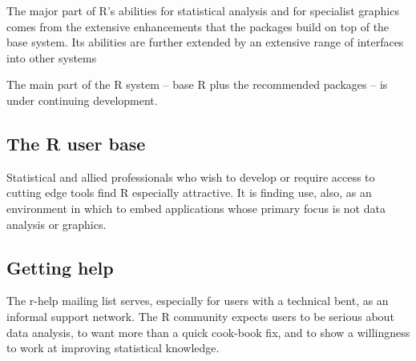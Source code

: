 The major part of R's abilities for statistical analysis
and for specialist graphics comes from the extensive enhancements that
the packages build on top of the base system.  Its abilities are
further extended by an extensive range of interfaces into
other systems

The main part of the R system -- base R plus the recommended packages
-- is under continuing development.
\subsection*{The R user base}

Statistical and allied professionals who wish to
develop or require access to cutting edge tools find R especially
attractive.  It is finding use, also, as an environment in which to
embed applications whose primary focus is not data analysis or
graphics.

\subsection*{Getting help}

\begin{fullwidth}
\end{fullwidth}

The r-help mailing list  serves, especially
for users with a technical bent, as an informal support network.  The
R community expects users to be serious about data analysis, to want
more than a quick cook-book fix, and to show a willingness to work at
improving statistical knowledge.

